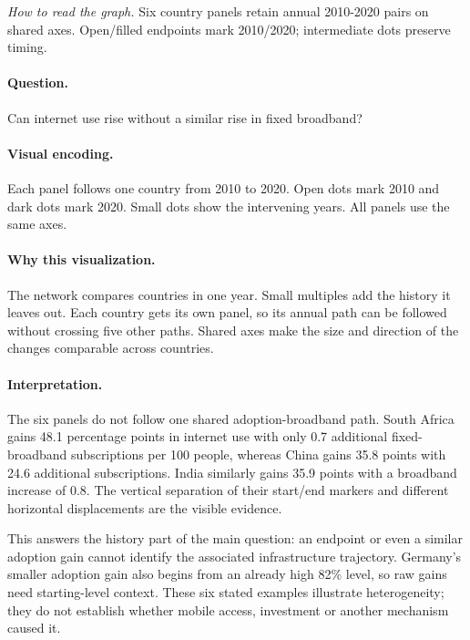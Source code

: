 \documentclass[conference,a4paper]{IEEEtran}
\begin{document}
\noindent\textit{How to read the graph.} Six country panels retain annual 2010-2020 pairs on shared axes. Open/filled endpoints mark 2010/2020; intermediate dots preserve timing.

\paragraph{Question.} Can internet use rise without a similar rise in fixed broadband?



\paragraph{Visual encoding.} Each panel follows one country from 2010 to 2020. Open dots mark 2010 and dark dots mark 2020. Small dots show the intervening years. All panels use the same axes.



\paragraph{Why this visualization.} The network compares countries in one year. Small multiples add the history it leaves out. Each country gets its own panel, so its annual path can be followed without crossing five other paths. Shared axes make the size and direction of the changes comparable across countries.



\paragraph{Interpretation.} The six panels do not follow one shared adoption-broadband path. South Africa gains 48.1 percentage points in internet use with only 0.7 additional fixed-broadband subscriptions per 100 people, whereas China gains 35.8 points with 24.6 additional subscriptions. India similarly gains 35.9 points with a broadband increase of 0.8. The vertical separation of their start/end markers and different horizontal displacements are the visible evidence.

This answers the history part of the main question: an endpoint or even a similar adoption gain cannot identify the associated infrastructure trajectory. Germany's smaller adoption gain also begins from an already high 82\% level, so raw gains need starting-level context. These six stated examples illustrate heterogeneity; they do not establish whether mobile access, investment or another mechanism caused it.
\end{document}
